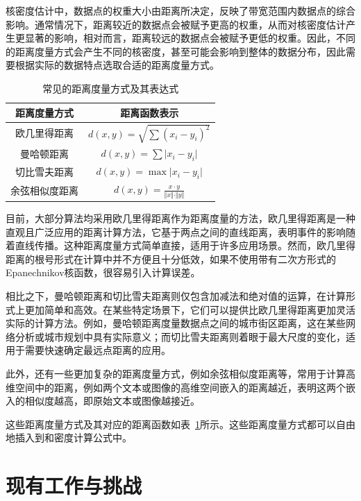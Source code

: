 核密度估计中，数据点的权重大小由距离所决定，反映了带宽范围内数据点的综合影响。通常情况下，距离较近的数据点会被赋予更高的权重，从而对核密度估计产生更显著的影响，相对而言，距离较远的数据点会被赋予更低的权重。因此，不同的距离度量方式会产生不同的核密度，甚至可能会影响到整体的数据分布，因此需要根据实际的数据特点选取合适的距离度量方式。

\begin{table}[!h]
	\centering
	\def\arraystretch{1.5}
	\caption{常见的距离度量方式及其表达式}
	\label{tab2}
	\begin{tabular}{c|c}
		\hline
		距离度量方式       & 距离函数表示   \\ \hline \hline
		欧几里得距离 & $d(x, y) = \sqrt{\sum{(x_i - y_i)}^2}$ \\ 
		曼哈顿距离   & $d(x, y) = \sum \vert x_i - y_i \vert$ \\ 
		切比雪夫距离 & $d(x, y) = \max \vert x_i - y_i \vert$ \\ 
		余弦相似度距离	 & $d(x, y) = \frac{x \cdot y}{\Vert x \Vert \cdot \Vert y \Vert}$     \\ \hline
	\end{tabular}
\end{table}

目前，大部分算法均采用欧几里得距离作为距离度量的方法，欧几里得距离是一种直观且广泛应用的距离计算方法，它基于两点之间的直线距离，表明事件的影响随着直线传播。这种距离度量方式简单直接，适用于许多应用场景。然而，欧几里得距离的根号形式在计算中并不方便且十分低效，如果不使用带有二次方形式的Epanechnikov核函数，很容易引入计算误差。

相比之下，曼哈顿距离和切比雪夫距离则仅包含加减法和绝对值的运算，在计算形式上更加简单和高效。在某些特定场景下，它们可以提供比欧几里得距离更加灵活实际的计算方法。例如，曼哈顿距离度量数据点之间的城市街区距离，这在某些网络分析或城市规划中具有实际意义；而切比雪夫距离则着眼于最大尺度的变化，适用于需要快速确定最远点距离的应用。

此外，还有一些更加复杂的距离度量方式，例如余弦相似度距离等，常用于计算高维空间中的距离，例如两个文本或图像的高维空间嵌入的距离越近，表明这两个嵌入的相似度越高，即原始文本或图像越接近。

这些距离度量方式及其对应的距离函数如表~\ref{tab2}所示。这些距离度量方式都可以自由地插入到和密度计算公式中。

\section{现有工作与挑战}

